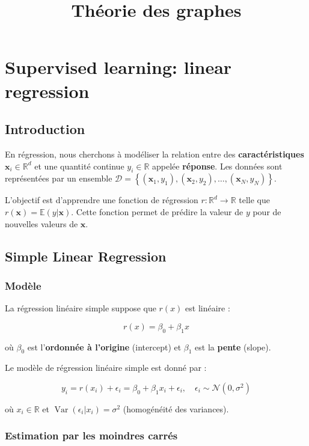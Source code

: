 \documentclass[10pt,a4paper]{article}
\title{Théorie des graphes}
\date{}
\begin{document}
\section*{Supervised learning: linear regression}

\subsection*{Introduction}

En régression, nous cherchons à modéliser la relation entre des \textbf{caractéristiques} $\mathbf{x}_{i} \in \mathbb{R}^{d}$ et une quantité continue $y_{i} \in \mathbb{R}$ appelée \textbf{réponse}. Les données sont représentées par un ensemble $\mathcal{D}=\left\{\left(\mathbf{x}_{1}, y_{1}\right),\left(\mathbf{x}_{2}, y_{2}\right), \ldots,\left(\mathbf{x}_{N}, y_{N}\right)\right\}$.

L'objectif est d'apprendre une fonction de régression $r: \mathbb{R}^d \to \mathbb{R}$ telle que $r(\mathbf{x}) = \mathbb{E}(y|\mathbf{x})$. Cette fonction permet de prédire la valeur de $y$ pour de nouvelles valeurs de $\mathbf{x}$.

\subsection*{Simple Linear Regression}

\subsubsection*{Modèle}

La régression linéaire simple suppose que $r(x)$ est linéaire :

$$
r(x) = \beta_{0} + \beta_{1} x
$$

où $\beta_{0}$ est l'\textbf{ordonnée à l'origine} (intercept) et $\beta_{1}$ est la \textbf{pente} (slope).

Le modèle de régression linéaire simple est donné par :

$$
y_{i} = r(x_{i}) + \epsilon_{i} = \beta_{0} + \beta_{1} x_{i} + \epsilon_{i}, \quad \epsilon_{i} \sim \mathcal{N}(0, \sigma^{2})
$$

où $x_{i} \in \mathbb{R}$ et $\operatorname{Var}(\epsilon_{i} | x_{i}) = \sigma^{2}$ (homogénéité des variances).

\subsubsection*{Estimation par les moindres carrés}
\end{document}
